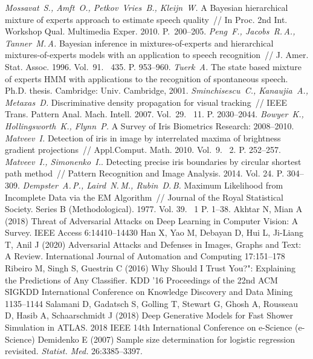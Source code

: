 \begin{thebibliography}{10}
	\textit{Mossavat~S., Amft~O., Petkov~Vries~B., Kleijn~W.} A Bayesian hierarchical mixture of experts approach to estimate speech quality~// In Proc. 2nd Int. Workshop Qual. Multimedia Exper. 2010. P.~200--205.
	\textit{Peng~F., Jacobs~R.\,A., Tanner~M.\,A.} Bayesian inference in mixtures-of-experts and hierarchical mixtures-of-experts models with an application to speech recognition~// J. Amer. Stat. Assoc. 1996. Vol.~91. \No~435. P. 953--960.
	\textit{Tuerk~A.} The state based mixture of experts HMM with applications to the recognition of spontaneous speech. Ph.D. thesis. Cambridge: Univ. Cambridge, 2001.
	\textit{Sminchisescu~C., Kanaujia~A., Metaxas~D.} Discriminative density propagation for visual tracking~// IEEE Trans. Pattern Anal. Mach. Intell. 2007. Vol.~29. \No~11. P. 2030--2044.
	\textit{Bowyer~K., Hollingsworth~K., Flynn~P.} A Survey of Iris Biometrics Research: 2008--2010.
	\textit{Matveev~I.} Detection of iris in image by interrelated maxima of brightness gradient projections~// Appl.Comput. Math. 2010. Vol.~9. \No~2. P. 252--257.
	\textit{Matveev~I., Simonenko~I.}. Detecting precise iris boundaries by circular shortest path method~// Pattern Recognition and Image Analysis. 2014. Vol. 24. P. 304--309.
	\textit{Dempster~A.\,P., Laird~N.\,M., Rubin~D.\,B.} Maximum Likelihood from Incomplete Data via the EM Algorithm~// Journal of the Royal Statistical Society. Series B (Methodological). 1977. Vol. 39. \No~1 P. 1--38.
	Akhtar N, Mian A (2018) Threat of Adversarial Attacks on Deep Learning in Computer Vision: A Survey. IEEE Access 6:14410--14430
	Han X, Yao M, Debayan D, Hui L, Ji-Liang T, Anil J (2020) Adversarial Attacks and Defenses in Images, Graphs and Text: A Review. International Journal of Automation and Computing 17:151--178
	Ribeiro M, Singh S, Guestrin C (2016) Why Should I Trust You?": Explaining the Predictions of Any Classifier. KDD ’16 Proceedings of the 22nd ACM SIGKDD International Conference on Knowledge Discovery and Data Mining 1135--1144
	Salamani D, Gadatsch S, Golling T,  Stewart G, Ghosh A,  Rousseau D,  Hasib A,  Schaarschmidt J (2018) Deep Generative Models for Fast Shower Simulation in ATLAS. 2018 IEEE 14th International Conference on e-Science (e-Science) 
	Demidenko E (2007) Sample size determination for logistic regression revisited. \textit{Statist. Med.} 26:3385--3397.

\end{thebibliography}
